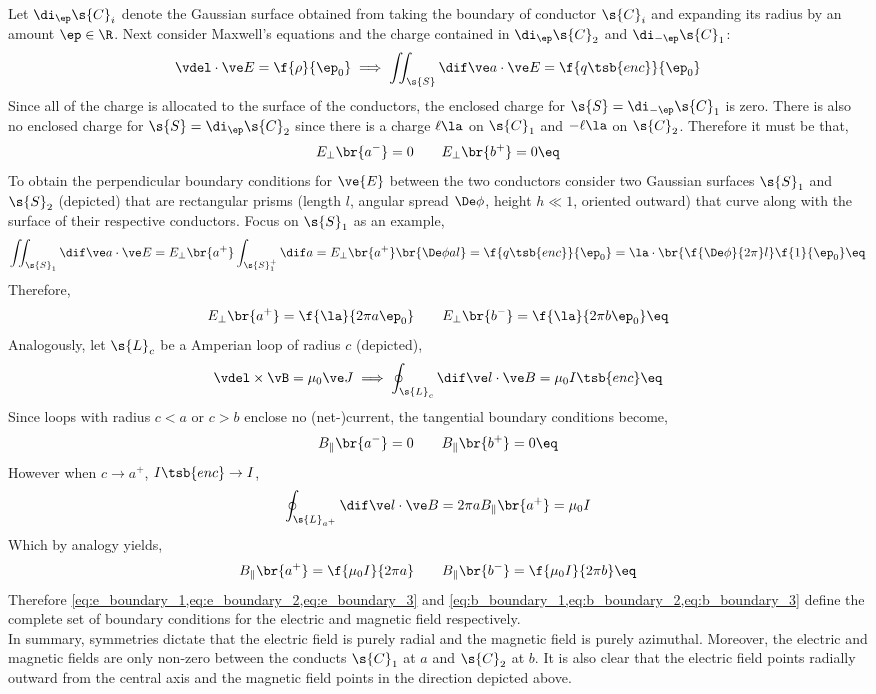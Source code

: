 \documentclass{article}
\begin{document}
Let $\di_{\ep} \s{C}_i$ denote the Gaussian surface obtained from taking the boundary of conductor $\s{C}_i$ and expanding its radius by an amount $\ep \in \R$. Next consider Maxwell's equations and the charge contained in $\di_{\ep} \s{C}_2$ and $\di_{-\ep} \s{C}_1$:
\[ \vdel \cdot \ve E = \f{\rho}{\ep_0} \implies \iint_{\s{S}} \dif \ve a \cdot \ve E = \f{q\tsb{enc}}{\ep_0} \]
Since all of the charge is allocated to the surface of the conductors, the enclosed charge for $\s{S} = \di_{-\ep} \s{C}_1$ is zero. There is also no enclosed charge for $\s{S} = \di_{\ep} \s{C}_2$ since there is a charge $\ell \la$ on $\s{C}_1$ and $-\ell \la$ on $\s{C}_2$. Therefore it must be that,
\[E_\perp\br{a^{-}} = 0 \qquad E_\perp\br{b^{+}} = 0 \eq \label{eq:e_boundary_2}\]
To obtain the perpendicular boundary conditions for $\ve{E}$ between the two conductors consider two Gaussian surfaces $\s{S}_1$ and $\s{S}_2$ (depicted) that are rectangular prisms (length $l$, angular spread $\De \phi$, height $h \ll 1$, oriented outward) that curve along with the surface of their respective conductors. Focus on $\s{S}_1$ as an example,
\[ \iint_{\s{S}_1} \dif \ve a \cdot \ve E = E_\perp\br{a^{+}}\int_{\s{S}^{+}_1} \dif a = E_\perp\br{a^{+}} \br{\De \phi a l} = \f{q\tsb{enc}}{\ep_0} = \la \cdot \br{\f{\De \phi}{2 \pi}l} \f{1}{\ep_0} \eq \label{eq:surf_arb}\]
Therefore,
\[E_\perp\br{a^{+}} = \f{\la}{2 \pi a \ep_0} \qquad E_\perp\br{b^{-}} = \f{\la}{2 \pi b \ep_0} \eq \label{eq:e_boundary_3}\]
Analogously, let $\s{L}_c$ be a Amperian loop of radius $c$ (depicted),
\[ \vdel \times \vB = \mu_0 \ve J \implies \oint_{\s{L}_c} \dif \ve l \cdot \ve B = \mu_0 I\tsb{enc}  \eq \label{eq:loop_c}\]
Since loops with radius $c < a$ or $c > b$ enclose no (net-)current, the tangential boundary conditions become,
\[ B_\parallel\br{a^{-}} = 0 \qquad B_\parallel\br{b^{+}} = 0 \eq \label{eq:b_boundary_2}\]
However when $c \to a^{+}$, $I\tsb{enc} \to I$,
\[ \oint_{\s{L}_{a^{+}}} \dif \ve l \cdot \ve B = 2 \pi a B_{\parallel}\br{a^{+}} = \mu_0 I \]
Which by analogy yields,
\[ B_\parallel\br{a^{+}} = \f{\mu_0 I }{2 \pi a} \qquad B_\parallel\br{b^{-}} = \f{\mu_0 I }{2 \pi b}  \eq \label{eq:b_boundary_3}\]
Therefore \cref{eq:e_boundary_1,eq:e_boundary_2,eq:e_boundary_3} and \cref{eq:b_boundary_1,eq:b_boundary_2,eq:b_boundary_3} define the complete set of boundary conditions for the electric and magnetic field respectively.\\

In summary, symmetries dictate that the electric field is purely radial and the magnetic field is purely azimuthal. Moreover, the electric and magnetic fields are only non-zero between the conducts $\s{C}_1$ at $a$ and $\s{C}_2$ at $b$. It is also clear that the electric field points radially outward from the central axis and the magnetic field points in the direction depicted above. \\
\end{document}
